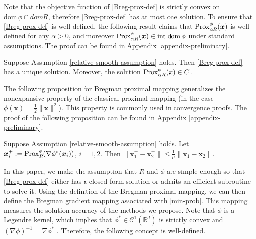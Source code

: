 \documentclass[twoside,11pt]{article}
\newcommand{\R}{\mathbb R}
\newcommand{\cC}{\mathcal C}
\def\vx{{\bm{x}}}
\begin{document}
Note that the objective function of \eqref{Breg-prox-def} is strictly convex on $\text{dom}\,\phi\cap domR$, therefore \eqref{Breg-prox-def} has at most one solution. To ensure that \eqref{Breg-prox-def} is well-defined, the following result claims that ${\rm Prox}^\phi_{\alpha R}(\vx)$ is well-defined for any $\alpha>0$, and moreover ${\rm Prox}^\phi_{\alpha R}(\vx)\in\text{int\;dom}\,\phi$ under standard assumptions. The proof can be found in Appendix \ref{appendix-preliminary}.
\begin{lemma}
Suppose Assumption \ref{relative-smooth-assumption} holds. Then \eqref{Breg-prox-def} has a unique solution. Moreover, the solution ${\rm Prox}^\phi_{\alpha R}(\vx)\in C$. 
\label{well-def-Breg-prox}
\end{lemma}
The following proposition for Bregman proximal mapping generalizes the nonexpansive property of the classical proximal mapping (in the case $\phi(\vx)=\frac{1}{2}\|\vx\|^2$). This property is commonly used in convergence proofs. The proof of the following proposition can be found in Appendix \ref{appendix-preliminary}.
\begin{proposition}
 Suppose Assumption \ref{relative-smooth-assumption} holds. Let $\vx_i^+:={\rm Prox}^\phi_R(\nabla\phi^*(\vx_i))$, $i=1,2$. Then $\|\vx^+_1-\vx^+_2\|\leq\frac{1}{\mu}\|\vx_1-\vx_2\|$.
\label{nonexpansive}
\end{proposition}


In this paper, we make the assumption that $R$ and $\phi$ are simple enough so that \eqref{Breg-prox-def}  either has a closed-form solution or {admits} an efficient subroutine to solve it. Using the definition of the Bregman proximal mapping, we can then define the Bregman gradient mapping associated with \eqref{min-prob}. This mapping measures the 
{solution accuracy of}
the methods we propose. Note that $\phi$ is a Legendre kernel, which implies that $\phi^*\in\cC^{1}(\R^d)$ is strictly convex and $(\nabla\phi)^{-1}=\nabla\phi^*$ \citep[Corollary 13.3.1, Theorem 26.5]{rockafellar1997convex}. Therefore, the following concept is well-defined. 
\end{document}
